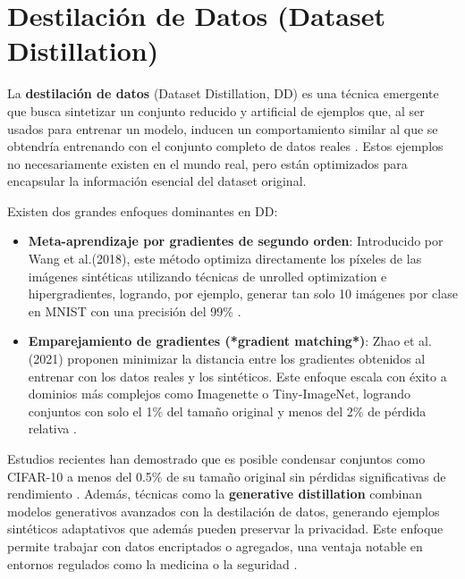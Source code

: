 \section{Destilación de Datos (Dataset Distillation)}
La \textbf{destilación de datos} (Dataset Distillation, DD) es una técnica emergente que busca sintetizar un conjunto reducido y artificial de ejemplos que, al ser usados para entrenar un modelo, inducen un comportamiento similar al que se obtendría entrenando con el conjunto completo de datos reales \cite{wang2018dhttps://arxiv.org/abs/1811.10959ataset}.
Estos ejemplos no necesariamente existen en el mundo real, pero están optimizados para encapsular la información esencial del dataset original.

Existen dos grandes enfoques dominantes en DD:

\begin{itemize}
    \item \textbf{Meta-aprendizaje por gradientes de segundo orden}: Introducido por Wang et al.(2018), este método optimiza directamente los píxeles de las imágenes sintéticas utilizando técnicas de unrolled optimization e hipergradientes, logrando, por ejemplo, generar tan solo 10 imágenes por clase en MNIST con una precisión del 99\% \cite{https://arxiv.org/abs/1811.10959}.
    \item \textbf{Emparejamiento de gradientes (*gradient matching*)}: Zhao et al.(2021) proponen minimizar la distancia entre los gradientes obtenidos al entrenar con los datos reales y los sintéticos.
          Este enfoque escala con éxito a dominios más complejos como Imagenette o Tiny-ImageNet, logrando conjuntos con solo el 1\% del tamaño original y menos del 2\% de pérdida relativa \cite{https://arxiv.org/abs/2006.05929}.
\end{itemize}

Estudios recientes han demostrado que es posible condensar conjuntos como CIFAR-10 a menos del 0.5\% de su tamaño original sin pérdidas significativas de rendimiento \cite{https://arxiv.org/abs/2301.05603}.
Además, técnicas como la \textbf{generative distillation} combinan modelos generativos avanzados con la destilación de datos, generando ejemplos sintéticos adaptativos que además pueden preservar la privacidad.
Este enfoque permite trabajar con datos encriptados o agregados, una ventaja notable en entornos regulados como la medicina o la seguridad \cite{https://openaccess.thecvf.com/content/CVPR2024W/DDCV/html/Li_Generative_Dataset_Distillation_Balancing_Global_Structure_and_Local_Details_CVPRW_2024_paper.html}.

